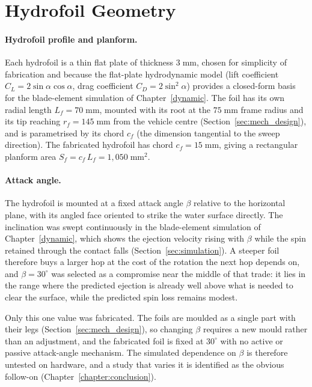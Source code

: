 \section{Hydrofoil Geometry}
\label{sec:foil_design}

\paragraph{Hydrofoil profile and planform.}
Each hydrofoil is a thin flat plate of thickness $3\;\mathrm{mm}$, chosen for
simplicity of fabrication and because the flat-plate hydrodynamic model
(lift coefficient $C_L = 2\sin\alpha\cos\alpha$, drag coefficient $C_D =
2\sin^2\alpha$) provides a closed-form basis for the blade-element
simulation of Chapter~\ref{dynamic}.  The foil has its own radial
length $L_f = 70\;\mathrm{mm}$, mounted with its root at the
$75\;\mathrm{mm}$ frame radius and its tip reaching $r_f = 145\;\mathrm{mm}$
from the vehicle centre (Section~\ref{sec:mech_design}), and is parametrised
by its chord $c_f$ (the dimension tangential to the sweep direction).  The
fabricated hydrofoil has chord $c_f = 15\;\mathrm{mm}$, giving a rectangular
planform area $S_f = c_f\, L_f = 1{,}050\;\mathrm{mm}^2$.

\paragraph{Attack angle.}
The hydrofoil is mounted at a fixed attack angle $\beta$ relative to the
horizontal plane, with its angled face oriented to strike the water surface
directly.  The inclination was swept continuously in the blade-element simulation of
Chapter~\ref{dynamic}, which shows the ejection velocity rising with $\beta$
while the spin retained through the contact falls
(Section~\ref{sec:simulation}).  A steeper foil therefore buys a larger hop at
the cost of the rotation the next hop depends on, and $\beta = 30^{\circ}$ was
selected as a compromise near the middle of that trade: it lies in the range
where the predicted ejection is already well above what is needed to clear the
surface, while the predicted spin loss remains modest.

Only this one value was fabricated.  The foils are moulded as a single part
with their legs (Section~\ref{sec:mech_design}), so changing $\beta$ requires a
new mould rather than an adjustment, and the fabricated foil is fixed at
$30^{\circ}$ with no active or passive attack-angle mechanism.  The simulated
dependence on $\beta$ is therefore untested on hardware, and a study that
varies it is identified as the obvious follow-on
(Chapter~\ref{chapter:conclusion}).


